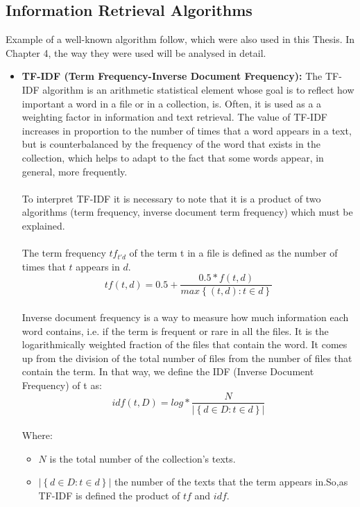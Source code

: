 \subsection{Information Retrieval Algorithms}\label{231_ref}
Example of a well-known algorithm follow, which were also used in this Thesis. In Chapter 4, the way they were used will be analysed in detail.\\
\begin{itemize}

	\item \textbf{TF-IDF (Term Frequency-Inverse Document Frequency):} The TF-IDF algorithm is an arithmetic statistical element whose goal is to reflect how important a word in a file or in a collection, is. Often, it is used as a a weighting factor in information and text retrieval. The value of TF-IDF increases in proportion to the number of times that a word appears in a text, but is counterbalanced by the frequency of the word that exists in the collection, which helps to adapt to the fact that some words appear, in general, more frequently.\\
\\
To interpret TF-IDF it is necessary to note that it is a product of two algorithms (term frequency, inverse document term frequency) which must be explained.\\
\\
The term frequency $tf_{t'd}$ of the term t in a file is defined as the number of times that $t$ appears in $d$. 
\\
\begin{equation}
tf\left(t,d\right)=0.5+\frac{0.5*f\left(t,d\right)}{max\left\lbrace\left(t,d\right):t \in d\right\rbrace}
\end{equation}
\\
Inverse document frequency is a way to measure how much information each word contains, i.e. if the term is frequent or rare in all the files. It is the logarithmically weighted fraction of the files that contain the word. It comes up from the division of the total number of files from the number of files that contain the term. In that way, we define the IDF (Inverse Document Frequency) of t as:
\\
\begin{equation}
idf\left(t,D\right)=log*\frac{N}{|\left\lbrace d \in D :t \in d\right\rbrace|}
\end{equation}
\\
Where:\\
\begin{itemize}

	\item $N$ is the total number of the collection's texts.
	\item $|\left\lbrace d \in D :t \in d\right\rbrace|$ the number of the texts that the term appears in.So,as TF-IDF is defined the product of $tf$ and $idf$.

\end{itemize}

\end{itemize}
